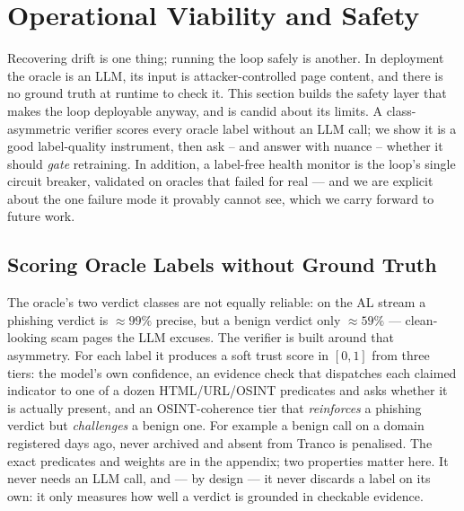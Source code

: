 
\section{Operational Viability and Safety}
\label{sec:safety}

Recovering drift is one thing; running the loop safely is another. In
deployment the oracle is an LLM, its input is attacker-controlled page content,
and there is no ground truth at runtime to check it. This section builds the
safety layer that makes the loop deployable anyway, and is candid about its
limits. A class-asymmetric verifier scores every oracle label without an LLM
call; we show it is a good label-quality instrument, then ask -- and answer
with nuance -- whether it should \emph{gate} retraining. In addition, a label-free
health monitor is the loop's single circuit breaker, validated on oracles that
failed for real --- and we are explicit about the one failure mode it provably
cannot see, which we carry forward to future work.

\subsection{Scoring Oracle Labels without Ground Truth}
\label{ssec:verifier}

The oracle's two verdict classes are not equally reliable: on the AL stream a
phishing verdict is $\approx\!99\%$ precise, but a benign verdict only
$\approx\!59\%$ --- clean-looking scam pages the LLM excuses. The verifier is
built around that asymmetry. For each label it produces a soft trust score in
$[0,1]$ from three tiers: the model's own confidence, an evidence check that
dispatches each claimed indicator to one of a dozen HTML/URL/OSINT predicates
and asks whether it is actually present, and an OSINT-coherence tier that
\emph{reinforces} a phishing verdict but \emph{challenges} a benign one. For example a benign
call on a domain registered days ago, never archived and absent from Tranco is
penalised. The exact predicates and weights are in the appendix; two properties
matter here. It never needs an LLM call, and --- by design --- it never discards a
label on its own: it only measures how well a verdict is grounded in checkable
evidence.


